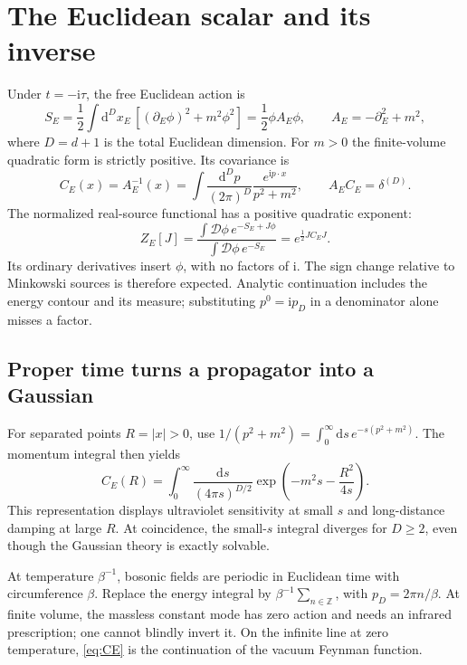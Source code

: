 \documentclass[11pt]{article}
\newcommand{\dd}{\mathrm d}
\newcommand{\ii}{\mathrm i}
\newcommand{\D}{\mathcal D}
\newcommand{\module}[1]{\clearpage\section{#1}}
\begin{document}
\module{The Euclidean scalar and its inverse}
Under \(t=-\ii\tau\), the free Euclidean action is
\begin{equation}
 S_E=\frac12\int\dd^Dx_E\,
 [ (\partial_E\phi)^2+m^2\phi^2]
 =\frac12\phi A_E\phi,\qquad A_E=-\partial_E^2+m^2,
\end{equation}
where \(D=d+1\) is the total Euclidean dimension. For \(m>0\) the
finite-volume quadratic form is strictly positive. Its covariance is
\begin{equation}
 C_E(x)=A_E^{-1}(x)=\int\frac{\dd^Dp}{(2\pi)^D}
 \frac{e^{\ii p\cdot x}}{p^2+m^2},\qquad A_EC_E=\delta^{(D)}.
                                                        \label{eq:CE}
\end{equation}
The normalized real-source functional has a positive quadratic exponent:
\begin{equation}
 Z_E[J]=\frac{\int\D\phi\,e^{-S_E+J\phi}}{\int\D\phi\,e^{-S_E}}
 =e^{\frac12JC_EJ}.
\end{equation}
Its ordinary derivatives insert \(\phi\), with no factors of \(\ii\).
The sign change relative to Minkowski sources is therefore expected.
Analytic continuation includes the energy contour and its measure;
substituting \(p^0=\ii p_D\) in a denominator alone misses a factor.

\subsection{Proper time turns a propagator into a Gaussian}
For separated points \(R=|x|>0\), use
\(1/(p^2+m^2)=\int_0^\infty\dd s\,e^{-s(p^2+m^2)}\).
The momentum integral then yields
\begin{equation}
 C_E(R)=\int_0^\infty\frac{\dd s}{(4\pi s)^{D/2}}
 \exp\!\left(-m^2s-\frac{R^2}{4s}\right).             \label{eq:propertime}
\end{equation}
This representation displays ultraviolet sensitivity at small \(s\)
and long-distance damping at large \(R\). At coincidence, the
small-\(s\) integral diverges for \(D\geq2\), even though the
Gaussian theory is exactly solvable.

At temperature \(\beta^{-1}\), bosonic fields are periodic in
Euclidean time with circumference \(\beta\). Replace the energy
integral by \(\beta^{-1}\sum_{n\in\mathbb Z}\), with
\(p_D=2\pi n/\beta\). At finite volume, the massless constant mode
has zero action and needs an infrared prescription; one cannot
blindly invert it. On the infinite line at zero temperature,
\eqref{eq:CE} is the continuation of the vacuum Feynman function.
\end{document}
